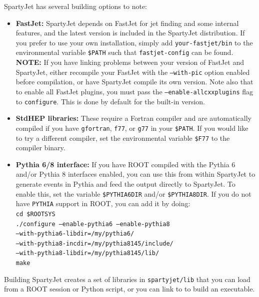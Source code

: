 \documentclass{article}
\newcommand{\prog}[1]{{\sc #1}\xspace}
\newcommand{\code}[1]{{\tt #1}\xspace}
\newcommand{\SJ}[0]{\prog{SpartyJet}}
\newcommand{\FJ}[0]{\prog{FastJet}}
\begin{document}
\SJ has several building options to note:
\begin{itemize}

\item {\bf FastJet:} \SJ depends on \FJ for jet finding and some internal features, and the latest version is included in the \SJ distribution.  If you prefer to use your own installation, simply add \code{your-fastjet/bin} to the environmental variable \code{\$PATH} such that \code{fastjet-config} can be found.\\  
{\bf NOTE:} If you have linking problems between your version of \FJ and \SJ, either recompile your \FJ with the \code{--with-pic} option enabled before compilation, or have \SJ compile its own version.  Note also that to enable all \FJ plugins, you must pass the \code{--enable-allcxxplugins} flag to \code{configure}.  This is done by default for the built-in version.

\item {\bf StdHEP libraries:} These require a Fortran compiler and are automatically compiled if you have \code{gfortran}, \code{f77}, or \code{g77} in your  \code{\$PATH}. If you would like to try a different compiler, set the environmental variable \code{\$F77} to the compiler binary.

\item {\bf Pythia 6/8 interface:}  If you have \prog{ROOT} compiled with the Pythia 6 and/or Pythia 8 interfaces enabled, you can use this from within \SJ to generate events in Pythia and feed the output directly to \SJ.  To enable this, set the variable \code{\$PYTHIA6DIR} and/or \code{\$PYTHIA8DIR}.  If you do not have \code{PYTHIA} support in ROOT, you can add it by doing:\\
\code{cd \$ROOTSYS \\
./configure --enable-pythia6 --enable-pythia8\\ 
--with-pythia6-libdir=/my/pythia6/ \\
--with-pythia8-incdir=/my/pythia8145/include/ \\
--with-pythia8-libdir=/my/pythia8145/lib/\\
make}

\end{itemize}


Building \SJ creates a set of libraries in \verb+spartyjet/lib+ that you can load from a ROOT session or Python script, or you can link to to build an executable.
\end{document}
